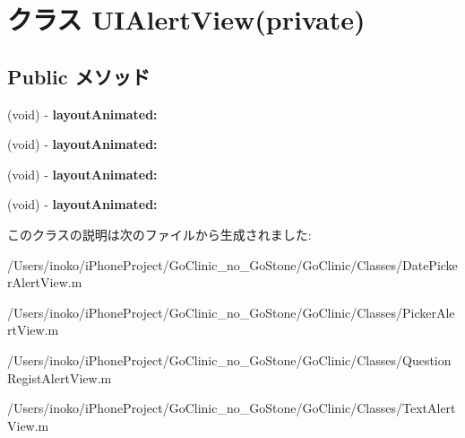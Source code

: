 \hypertarget{interface_u_i_alert_view_07private_08}{
\section{クラス UIAlertView(private)}
\label{interface_u_i_alert_view_07private_08}
}
\subsection*{Public メソッド}
\begin{DoxyCompactItemize}
\item 
\hypertarget{interface_u_i_alert_view_07private_08_a216cdbd8054188d80df891e862b8e0a7}{
(void) -\/ {\bfseries layoutAnimated:}}
\label{interface_u_i_alert_view_07private_08_a216cdbd8054188d80df891e862b8e0a7}

\item 
\hypertarget{interface_u_i_alert_view_07private_08_a216cdbd8054188d80df891e862b8e0a7}{
(void) -\/ {\bfseries layoutAnimated:}}
\label{interface_u_i_alert_view_07private_08_a216cdbd8054188d80df891e862b8e0a7}

\item 
\hypertarget{interface_u_i_alert_view_07private_08_a216cdbd8054188d80df891e862b8e0a7}{
(void) -\/ {\bfseries layoutAnimated:}}
\label{interface_u_i_alert_view_07private_08_a216cdbd8054188d80df891e862b8e0a7}

\item 
\hypertarget{interface_u_i_alert_view_07private_08_a216cdbd8054188d80df891e862b8e0a7}{
(void) -\/ {\bfseries layoutAnimated:}}
\label{interface_u_i_alert_view_07private_08_a216cdbd8054188d80df891e862b8e0a7}

\end{DoxyCompactItemize}


このクラスの説明は次のファイルから生成されました:\begin{DoxyCompactItemize}
\item 
/Users/inoko/iPhoneProject/GoClinic\_\-no\_\-GoStone/GoClinic/Classes/DatePickerAlertView.m\item 
/Users/inoko/iPhoneProject/GoClinic\_\-no\_\-GoStone/GoClinic/Classes/PickerAlertView.m\item 
/Users/inoko/iPhoneProject/GoClinic\_\-no\_\-GoStone/GoClinic/Classes/QuestionRegistAlertView.m\item 
/Users/inoko/iPhoneProject/GoClinic\_\-no\_\-GoStone/GoClinic/Classes/TextAlertView.m\end{DoxyCompactItemize}
